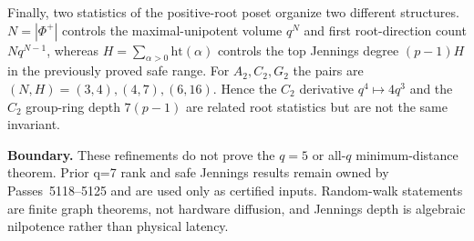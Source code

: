Finally, two statistics of the positive-root poset organize two different structures.  $N=|\Phi^+|$ controls the maximal-unipotent volume $q^N$ and first root-direction count $Nq^{N-1}$, whereas $H=\sum_{\alpha>0}\mathrm{ht}(\alpha)$ controls the top Jennings degree $(p-1)H$ in the previously proved safe range.  For $A_2,C_2,G_2$ the pairs are $(N,H)=(3,4),(4,7),(6,16)$.  Hence the $C_2$ derivative $q^4\mapsto4q^3$ and the $C_2$ group-ring depth $7(p-1)$ are related root statistics but are not the same invariant.

\textbf{Boundary.}  These refinements do not prove the $q=5$ or all-$q$ minimum-distance theorem.  Prior q=7 rank and safe Jennings results remain owned by Passes~5118--5125 and are used only as certified inputs.  Random-walk statements are finite graph theorems, not hardware diffusion, and Jennings depth is algebraic nilpotence rather than physical latency.
\fi
